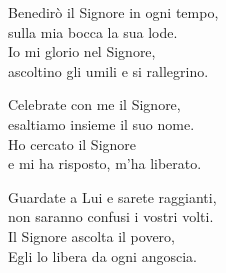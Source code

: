 

\spazio

\strofa Benedirò il Signore in ogni tempo,\\
sulla mia bocca la sua lode.\\
Io mi glorio nel Signore,\\
ascoltino gli umili e si rallegrino.

\spazio


\spazio

\strofa Celebrate con me il Signore,\\
esaltiamo insieme il suo nome.\\
Ho cercato il Signore\\
e mi ha risposto, m'ha liberato.

\spazio


\spazio

\strofa Guardate a Lui e sarete raggianti,\\
non saranno confusi i vostri volti.\\
Il Signore ascolta il povero,\\
Egli lo libera da ogni angoscia.

\spazio

